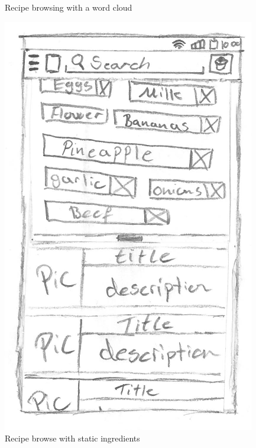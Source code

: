 \begin{figure}[H]
\begin{minipage}[b]{0.5\columnwidth}
\caption{Recipe browsing with a word cloud\label{fig:recipecloud}}
\end{minipage}
\end{figure}

\begin{figure}[H]
\begin{minipage}[b]{0.5\columnwidth}
\centering
\includegraphics[width=0.7\columnwidth]{img/prototypes/recipe_browse2.pdf}
\caption{Recipe browse with static ingredients\label{fig:recipestatic}}
\end{minipage}
\hspace{0.5cm}
\begin{minipage}[b]{0.5\columnwidth}
\centering

\end{minipage}
\end{figure}
